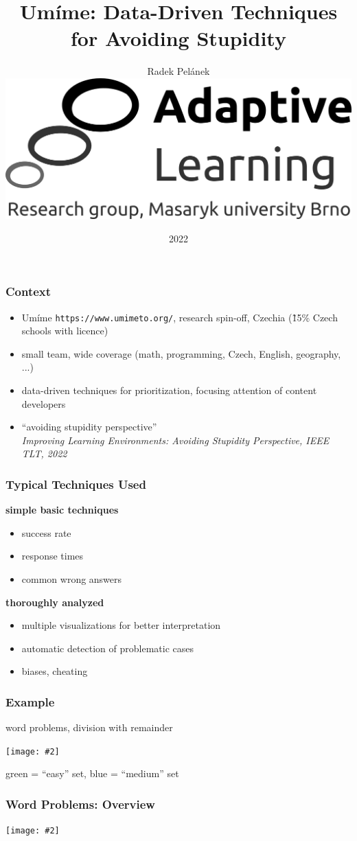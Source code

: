 \documentclass[bigger]{beamer}
\title{Umíme: Data-Driven Techniques for Avoiding Stupidity}
\author{Radek Pelánek\\[10mm]
  \includegraphics[width=.2\linewidth]{al-logo-researchgroup}}
\date{2022}
\newcommand{\img}[2]{\begin{center}\texttt{[image: \#2]}\end{center}}
\begin{document}
\frame{\titlepage}

\begin{frame}
  \frametitle{Context}

  \begin{itemize}
  \item Umíme \texttt{https://www.umimeto.org/}, research spin-off, Czechia
    (\~ 15\% Czech schools with licence)
  \item small team, wide coverage (math, programming, Czech, English,
    geography, ...)
  \item data-driven techniques for prioritization, focusing attention of
    content developers
  \item ``avoiding stupidity perspective''\\
    \emph{Improving Learning Environments: Avoiding Stupidity Perspective, IEEE
      TLT, 2022}
  \end{itemize}
\end{frame}

\begin{frame}
  \frametitle{Typical Techniques Used}

  \textbf{simple basic techniques}
  \begin{itemize}
  \item success rate
  \item response times
  \item common wrong answers
  \end{itemize}

  \bigskip

  \textbf{thoroughly analyzed}
  \begin{itemize}
  \item multiple visualizations for better interpretation
  \item automatic detection of problematic cases
  \item biases, cheating
  \end{itemize}
\end{frame}

\begin{frame}
  \frametitle{Example}

  word problems, division with remainder

  \img{.9}{wp-division-remainder}

  {\small green = ``easy'' set, blue = ``medium'' set}
\end{frame}

\begin{frame}
  \frametitle{Word Problems: Overview}

  \img{.9}{wp-overview}
\end{frame}
\end{document}
